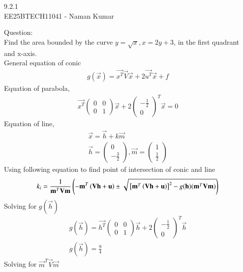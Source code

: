 \documentclass[a5paper,10pt]{article}
\author{EE25BTECH11041-Naman Kumar }
\begin{document}
\begin{center}
    \huge{9.2.1}\\
    \large{EE25BTECH11041 - Naman Kumar}
\end{center}
Question:\\
Find the area bounded by the curve $y=\sqrt{x},x=2y+3$, in the first quadrant and
x-axis.
\solution \\
General equation of conic
\begin{align}
    g(\vec{x})=\vec{x^T}\vec{V}\vec{x}+2\vec{u^T}\vec{x}+f
\end{align}
Equation of parabola,
\begin{align}
    \vec{x^T}\begin{pmatrix}0&0\\0&1\end{pmatrix}\vec{x}+2\begin{pmatrix}-\frac{1}{2}\\0\end{pmatrix}^T\vec{x}=0
\end{align}
Equation of line,
\begin{align}
    \vec{x}=\vec{h}+k\vec{m} \\
    \vec{h}=\begin{pmatrix}0\\-\frac{3}{2}\end{pmatrix},\vec{m}=\begin{pmatrix}1\\ \frac{1}{2} \end{pmatrix}
\end{align}
Using following equation to find point of intersection of conic and line
\begin{align}
    k_i=\frac{1}{\mathbf{m}^T\mathbf{V}\mathbf{m}}\left(-\mathbf{m}^T\left(\mathbf{V}\mathbf{h}+\mathbf{u}\right) \pm \sqrt{{}\left[\mathbf{m}^T\left(\mathbf{V}\mathbf{h}+\mathbf{u}\right)\right]^2-g(\mathbf{h})(\mathbf{m}^T\mathbf{V}\mathbf{m})} \right) \label{main}
\end{align}
Solving for $g(\vec{h})$
\begin{align}
    g(\vec{h})=\vec{h^T}\begin{pmatrix}0&0\\0&1\end{pmatrix}\vec{h}+2\begin{pmatrix}-\frac{1}{2}\\0\end{pmatrix}^T\vec{h}\\
    g(\vec{h})=\frac{9}{4} \label{g}
\end{align}
Solving for $\vec{m}^T\vec{V}\vec{m}$
\end{document}
